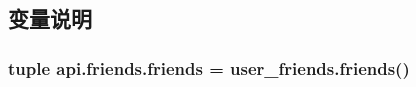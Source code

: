 \subsection{变量说明}
\hypertarget{namespaceapi_1_1friends_a1066d60affc1ff609cc3828da439c9ff}{
\subsubsection[{friends}]{\setlength{\rightskip}{0pt plus 5cm}tuple api.\-friends.\-friends = user\-\_\-friends.\-friends()}}\label{namespaceapi_1_1friends_a1066d60affc1ff609cc3828da439c9ff}
